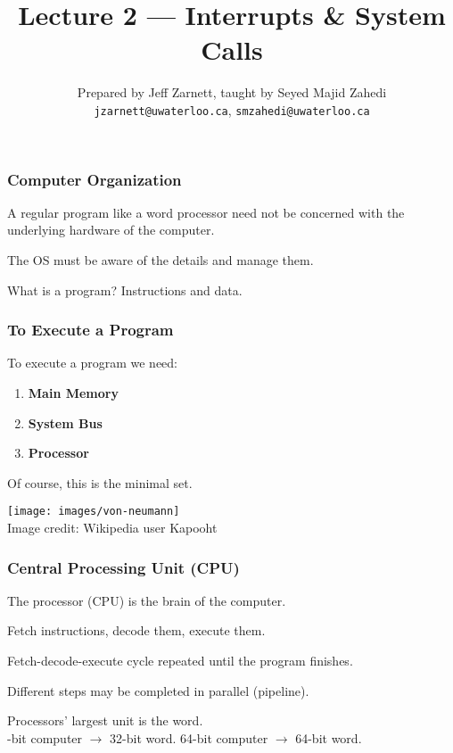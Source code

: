 

\title{Lecture 2 --- Interrupts \& System Calls }

\author{Prepared by Jeff Zarnett, taught by Seyed Majid Zahedi \\ \small \texttt{jzarnett@uwaterloo.ca}, \texttt{smzahedi@uwaterloo.ca}}
\date{}




\begin{frame}
	\titlepage

\end{frame}

\begin{frame}
	\frametitle{Computer Organization}

	A regular program like a word processor need not be concerned with the underlying hardware of the computer.

	The OS must be aware of the details and manage them.

	What is a program? Instructions and data.


\end{frame}

\begin{frame}
	\frametitle{To Execute a Program}

	To execute a program we need:

	\begin{enumerate}
		\item \textbf{Main Memory}
		\item \textbf{System Bus}
		\item \textbf{Processor}
	\end{enumerate}

	Of course, this is the minimal set.

	\begin{center}
		\texttt{[image: images/von-neumann]}\\
		Image credit: Wikipedia user Kapooht
	\end{center}



\end{frame}


\begin{frame}
	\frametitle{Central Processing Unit (CPU)}

	The processor (CPU) is the brain of the computer.

	Fetch instructions, decode them, execute them.

	Fetch-decode-execute cycle repeated until the program finishes.

	Different steps may be completed in parallel (\alert{pipeline}).

	Processors' largest unit is the \alert{word}.\\
	-bit computer $\rightarrow$ 32-bit word. 64-bit computer $\rightarrow$ 64-bit word.

\end{frame}


